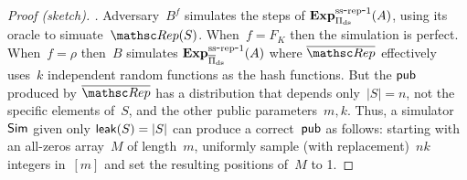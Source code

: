 \begin{proof}[Proof (sketch). ] 
Adversary~$B^{f}$ simulates the steps of $\mathrm{\mathbf{Exp}}^{\mathrm{ss\mbox{-}rep\mbox{-}1}}_{\Pi_{\mathrm{ds}}}(A)$, using its oracle to simuate~$\Rep(S)$.  When~$f=F_K$ then the simulation is perfect.  When~$f=\rho$ then~$B$ simulates $\mathrm{\mathbf{Exp}}^{\mathrm{ss\mbox{-}rep\mbox{-}1}}_{\overline{\Pi}_{\mathrm{ds}}}(A)$ where $\overline{\Rep}$ effectively uses~$k$ independent random functions as the hash functions.  But the ${\sf pub}$ produced by $\overline{\Rep}$ has a distribution that depends only~$|S|=n$, not the specific elements of~$S$, and the other public parameters~$m,k$.  Thus, a simulator~${\sf Sim}$ given only ${\sf leak}(S)=|S|$ can produce a correct~${\sf pub}$ as follows: starting with an all-zeros array~$M$ of length~$m$, uniformly sample (with replacement)~$nk$ integers in~$[m]$ and set the resulting positions of~$M$ to 1.
\end{proof}
